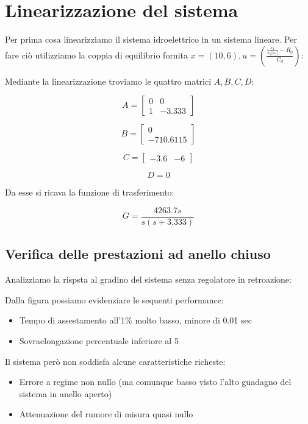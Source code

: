\documentclass{article}
\begin{document}
\section{Linearizzazione del sistema}

Per prima cosa linearizziamo il sistema idroelettrico in un sistema lineare. Per fare ciò utilizziamo la coppia di equilibrio fornita $x=(10,6), u=(\frac{\frac{x_1}{x_2 |x_2|}-R_0}{C_d})$:

Mediante la linearizzazione troviamo le quattro matrici $A,B,C,D$:

$$
A=
\begin{bmatrix}
    0 & 0\\
    1 & -3.333
\end{bmatrix}
$$

$$
B=
\begin{bmatrix}
    0\\
    -710.6115
\end{bmatrix}
$$

$$
C=
\begin{bmatrix}
    -3.6 & -6
\end{bmatrix}
$$

$$
D=0
$$

Da esse si ricava la funzione di trasferimento:

$$
G=\frac{4263.7 s}{s (s+3.333)}
$$

\subsection{Verifica delle prestazioni ad anello chiuso}

Analizziamo la rispsta al gradino del sistema senza regolatore in retroazione:


Dalla figura possiamo evidenziare le sequenti performance:

\begin{itemize}
    \item Tempo di assestamento all'1\% molto basso, minore di 0.01 sec
    \item Sovraelongazione percentuale inferiore al 5%
\end{itemize}

Il sistema però non soddisfa alcune caratteristiche richeste:

\begin{itemize}
    \item Errore a regime non nullo (ma comunque basso visto l'alto guadagno del sistema in anello aperto)
    \item Attenuazione del rumore di misura quasi nullo
\end{itemize}
\end{document}
